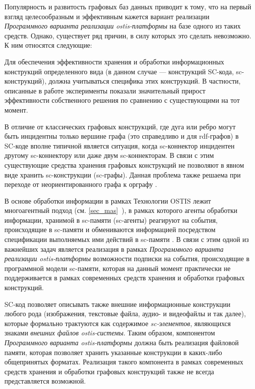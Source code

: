 Популярность и развитость графовых баз данных приводит к тому, что на первый взгляд целесообразным и эффективным кажется вариант реализации \textit{Программного варианта реализации ostis-платформы} на базе одного из таких средств. Однако, существует ряд причин, в силу которых это сделать невозможно. К ним относятся следующие:
\begin{textitemize}
    \item Для обеспечения эффективности хранения и обработки информационных конструкций определенного вида (в данном случае --- конструкций SC-кода, sc-конструкций), должна учитываться специфика этих конструкций. В частности, описанные в работе  эксперименты показали значительный прирост эффективности собственного решения по сравнению с существующими на тот момент.
    \item В отличие от классических графовых конструкций, где дуга или ребро могут быть инцидентны только вершине графа (это справедливо и для rdf-графов) в SC-коде вполне типичной является ситуация, когда sc-коннектор инцидентен другому sc-коннектору или даже двум sc-коннекторам. В связи с этим существующие средства хранения графовых конструкций не позволяют в явном виде хранить sc-конструкции (sc-графы). Данная проблема также решаема при переходе от неориентированного графа к орграфу .
    \item В основе обработки информации в рамках Технологии OSTIS лежит многоагентный подход (см. \ref{sec_mas}~), в рамках которого агенты обработки информации, хранимой в sc-памяти (sc-агенты) реагируют на события, происходящие в sc-памяти и обмениваются информацией посредством спецификации выполняемых ими действий в sc-памяти . В связи с этим одной из важнейших задач является реализация в рамках \textit{Программного варианта реализации ostis-платформы} возможности подписки на события, происходящие в программной модели sc-памяти, которая на данный момент практически не поддерживается в рамках современных средств хранения и обработки графовых конструкций.
    \item SC-код позволяет описывать также внешние информационные конструкции любого рода (изображения, текстовые файла, аудио- и видеофайлы и так далее), которые формально трактуются как содержимое \textit{sc-элементов}, являющихся знаками \textit{внешних файлов ostis-системы}. Таким образом, компонентом \textit{Программного варианта ostis-платформы} должна быть реализация файловой памяти, которая позволяет хранить указанные конструкции в каких-либо общепринятых форматах. Реализация такого компонента в рамках современных средств хранения и обработки графовых конструкций также не всегда представляется возможной.
\end{textitemize}

